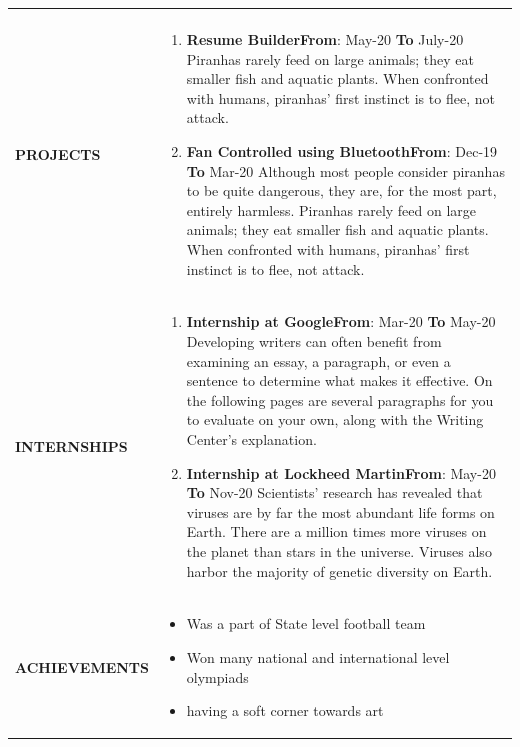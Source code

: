 \documentclass{article}
\begin{document}
{\begin{longtable}{ p{3.5cm}|p{13.5cm} }
{}
\\
{\textbf{\uppercase{Projects}}}&
\small{
\begin{enumerate}
	\item {\textbf{Resume Builder}}\hfill {\textbf{From}}: May-20 {\textbf{To}} July-20\newline
	Piranhas rarely feed on large animals; they eat smaller fish and aquatic plants. When confronted with humans, piranhas' first instinct is to flee, not attack. 
	\item {\textbf{Fan Controlled using Bluetooth}}\hfill {\textbf{From}}: Dec-19 {\textbf{To}} Mar-20\newline
	Although most people consider piranhas to be quite dangerous, they are, for the most part, entirely harmless. Piranhas rarely feed on large animals; they eat smaller fish and aquatic plants. When confronted with humans, piranhas' first instinct is to flee, not attack. 
\end{enumerate}
}
\\
{\textbf{\uppercase{Internships}}}&
\small{
\begin{enumerate}
	\item {\textbf{Internship at Google}}\hfill {\textbf{From}}: Mar-20 {\textbf{To}} May-20\newline
	Developing writers can often benefit from examining an essay, a paragraph, or even a sentence to determine what makes it effective. On the following pages are several paragraphs for you to evaluate on your own, along with the Writing Center's explanation.
	\item {\textbf{Internship at Lockheed Martin}}\hfill {\textbf{From}}: May-20 {\textbf{To}} Nov-20\newline
	 Scientists' research has revealed that viruses are by far the most abundant life forms on Earth. There are a million times more viruses on the planet than stars in the universe. Viruses also harbor the majority of genetic diversity on Earth. 
\end{enumerate}
}
\\
{\textbf{\uppercase{Achievements}}}&
\small{
\begin{itemize}[noitemsep,nolistsep]
	\item Was a part of State level football team
	\item Won many national and international level olympiads
	\item having a soft corner towards art
\end{itemize}
}
\end{longtable} }
\end{document}
